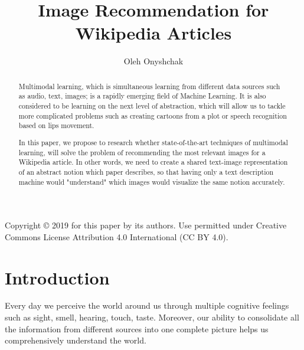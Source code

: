 \documentclass[runningheads]{llncs}
\begin{document}
%
%
\setlength{\tabcolsep}{10pt}
\renewcommand{\arraystretch}{1.5}
%
%
%
\title{Image Recommendation for Wikipedia Articles}
%
\author{Oleh Onyshchak}
%
%
\maketitle              %
%

\begin{abstract}
Multimodal learning, which is simultaneous learning from different data sources such as audio, text, images; is a rapidly emerging field of Machine Learning. It is also considered to be learning on the next level of abstraction, which will allow us to tackle more complicated problems such as creating cartoons from a plot or speech recognition based on lips movement. 

In this paper, we propose to research whether state-of-the-art techniques of multimodal learning, will solve the problem of recommending the most relevant images for a Wikipedia article. In other words, we need to create a shared text-image representation of an abstract notion which paper describes, so that having only a text description machine would "understand" which images would visualize the same notion accurately. 

\end{abstract}

\vfill
{
Copyright © 2019 for this paper by its authors. Use permitted under Creative Commons License Attribution 4.0 International (CC BY 4.0).\\
}
\newpage

%
%
%
\tableofcontents
\newpage


\section{Introduction}
Every day we perceive the world around us through multiple cognitive feelings such as sight, smell, hearing, touch, taste. Moreover, our ability to consolidate all the information from different sources into one complete picture helps us comprehensively understand the world.
\end{document}
